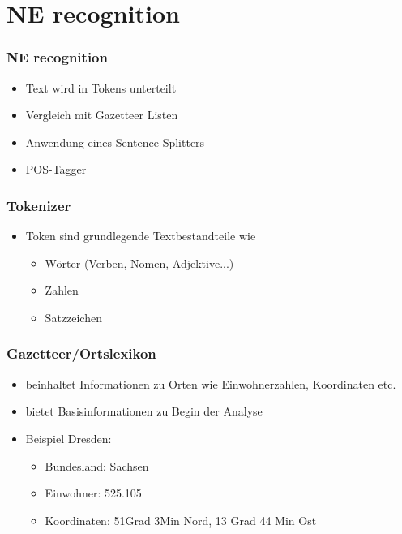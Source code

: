 \section{NE recognition}
\label{sec:ne-recognition}

\begin{frame}
  \frametitle{NE recognition}

  \begin{itemize}
  \item Text wird in Tokens unterteilt
  \item Vergleich mit Gazetteer Listen
  \item Anwendung eines Sentence Splitters
  \item POS-Tagger 
  \end{itemize}
\end{frame}

\begin{frame}
  \frametitle{Tokenizer}
  
  \begin{itemize}
  \item Token sind grundlegende Textbestandteile wie
    \begin{itemize}
      \item Wörter (Verben, Nomen, Adjektive...)
      \item Zahlen
      \item Satzzeichen
    \end{itemize}
  \end{itemize}
\end{frame}

\begin{frame}
  \frametitle{Gazetteer/Ortslexikon}

  \begin{itemize}
  \item beinhaltet Informationen zu Orten wie Einwohnerzahlen, Koordinaten etc.
  \item bietet Basisinformationen zu Begin der Analyse
  \item Beispiel Dresden:
    \begin{itemize}
    \item Bundesland: Sachsen
    \item Einwohner: 525.105
    \item Koordinaten: 51Grad 3Min Nord, 13 Grad 44 Min Ost
    \end{itemize}
  \end{itemize}
\end{frame}

